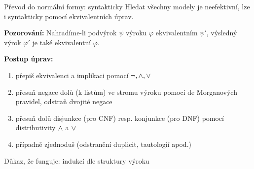 \documentclass{beamer}
\begin{document}
\begin{frame}{Převod do normální formy: syntakticky}
Hledat všechny modely je neefektivní, lze i syntakticky pomocí \alert{ekvivalentních úprav}.

\textbf{Pozorování:} Nahradíme-li podvýrok $\psi$ výroku $\varphi$ ekvivalentním $\psi'$, výsledný výrok $\varphi'$ je také ekvivalentní $\varphi$.

\textbf{Postup úprav:}
\begin{enumerate}
    \item přepiš ekvivalenci a implikaci pomocí $\neg,{\land},{\lor}$
    \item přesuň negace dolů (k listům) ve stromu výroku pomocí de Morganových pravidel, odstraň dvojité negace
    \item přesuň dolů disjunkce (pro CNF) resp. konjunkce (pro DNF) pomocí distributivity ${\land}$ a ${\lor}$
    \item případně zjednoduš (odstranění duplicit, tautologií apod.)
\end{enumerate}

Důkaz, že funguje: indukcí dle struktury výroku

\end{frame}
\end{document}
